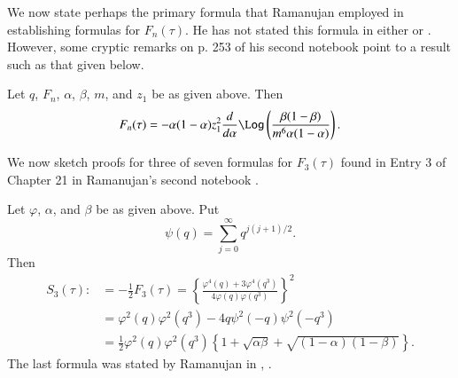 We now state perhaps the primary formula that Ramanujan employed in establishing formulas for $F_n (\tau)$. He has not stated this formula in either \cite{art3-key8} or \cite{art3-key9}. However, some cryptic remarks on p. 253 of his second notebook \cite{art3-key9} point to a result such as that given below.

\begin{theorem}\label{art3-thm1}
Let $q$, $F_n$, $\alpha$, $\beta$, $m$, and $z_1$ be as given above. Then
$$
F_n (\tau) = -\alpha (1-\alpha) z^2_1\frac{d}{d\alpha} \Log \left(\frac{\beta(1-\beta)}{m^6\alpha (1-\alpha)} \right).
$$
\end{theorem}

We now sketch proofs for three of seven formulas for $F_3 (\tau)$ found in Entry 3 of Chapter 21 in Ramanujan's second notebook \cite{art3-key9}.

\begin{theorem}\label{art3-thm2}
Let $\varphi$, $\alpha$, and $\beta$ be as given above. Put
$$
\psi (q) = \sum\limits^\infty_{j=0} q^{j(j+1)/2}.
$$
Then 
\begin{align}
S_3 (\tau) : &  = -\frac{1}{2} F_3 (\tau) = \left\{\frac{\varphi^4 (q) + 3 \varphi^4 (q^3)}{4\varphi (q) \varphi(q^3)} \right\}^2\label{art3-eq2}\\
& = \varphi^2 (q) \varphi^2 (q^3) - 4 q\psi^2 (-q) \psi^2 (-q^3)\label{art3-eq3}\\
& = \frac{1}{2} \varphi^2 (q) \varphi^2 (q^3) \left\{1+ \sqrt{\alpha\beta} + \sqrt{(1-\alpha) (1-\beta)} \right\}.\label{art3-eq4}
\end{align}
The last formula was stated by Ramanujan in \cite{art3-key8}, \cite[p. 33]{art3-key10}.
\end{theorem}


